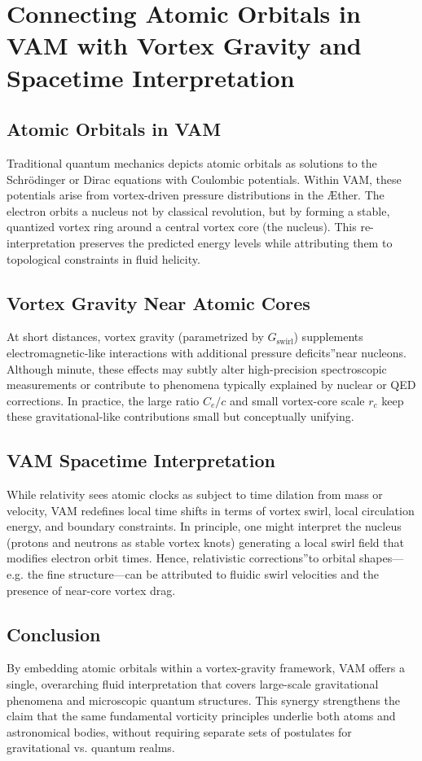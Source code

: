 \documentclass[a4paper,12pt]{article}
\begin{document}
\section{Connecting Atomic Orbitals in VAM with Vortex Gravity and Spacetime Interpretation}

\subsection{Atomic Orbitals in VAM}
Traditional quantum mechanics depicts atomic orbitals as solutions to the Schrödinger or Dirac equations with Coulombic potentials. Within VAM, these potentials arise from vortex-driven pressure distributions in the Æther. The electron orbits a nucleus not by classical revolution, but by forming a stable, quantized vortex ring around a central vortex core (the nucleus). This re-interpretation preserves the predicted energy levels while attributing them to topological constraints in fluid helicity.

\subsection{Vortex Gravity Near Atomic Cores}
At short distances, vortex gravity (parametrized by \(G_\text{swirl}\)) supplements electromagnetic-like interactions with additional \grqq pressure deficits\textquotedblright near nucleons. Although minute, these effects may subtly alter high-precision spectroscopic measurements or contribute to phenomena typically explained by nuclear or QED corrections. In practice, the large ratio \(C_e/c\) and small vortex-core scale \(r_c\) keep these gravitational-like contributions small but conceptually unifying.

\subsection{VAM Spacetime Interpretation}
While relativity sees atomic clocks as subject to time dilation from mass or velocity, VAM redefines local time shifts in terms of vortex swirl, local circulation energy, and boundary constraints. In principle, one might interpret the nucleus (protons and neutrons as stable vortex knots) generating a local swirl field that modifies electron orbit times. Hence, \grqq relativistic corrections\textquotedblright to orbital shapes—e.g. the fine structure—can be attributed to fluidic swirl velocities and the presence of near-core vortex drag.

\subsection{Conclusion}
By embedding atomic orbitals within a vortex-gravity framework, VAM offers a single, overarching fluid interpretation that covers large-scale gravitational phenomena and microscopic quantum structures. This synergy strengthens the claim that the same fundamental vorticity principles underlie both atoms and astronomical bodies, without requiring separate sets of postulates for gravitational vs. quantum realms.
\end{document}

